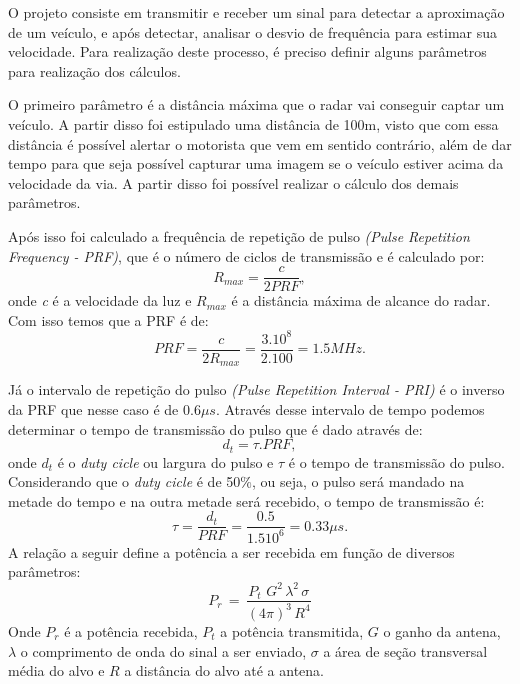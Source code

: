 O projeto consiste em transmitir e receber um sinal para detectar a aproximação de um veículo, e após detectar, analisar o desvio de frequência para estimar sua velocidade. Para realização deste processo, é preciso definir alguns parâmetros para realização dos cálculos.

O primeiro parâmetro é a distância máxima que o radar vai conseguir captar um veículo. A partir disso foi estipulado uma distância de 100m, visto que com essa distância é possível alertar o motorista que vem em sentido contrário, além de dar tempo para que seja possível capturar uma imagem se o veículo estiver acima da velocidade da via. A partir disso foi possível realizar o cálculo dos demais parâmetros.

Após isso foi calculado a frequência de repetição de pulso \emph{ (Pulse Repetition Frequency - PRF)},  que é o número de ciclos de transmissão e é calculado por:
\begin{equation}\label{R_MAX}
    R_{max} =  \frac{c}{2PRF},
\end{equation}
onde \emph{c} é a velocidade da luz e $R_{max}$ é a distância máxima de alcance do radar. Com isso temos que a PRF é de:
\begin{equation}\label{PRF}
  PRF =  \frac{c}{2R_{max}} = \frac{3.10^8}{2.100} = 1.5MHz.
\end{equation}

Já o intervalo de repetição do pulso \emph{(Pulse Repetition Interval - PRI)} é o inverso da PRF que nesse caso é de $0.6\mu s$. Através desse intervalo de tempo podemos determinar o tempo de transmissão do pulso que é dado através de: 
\begin{equation}\label{duty}
  d_t = \tau . PRF,
\end{equation}
onde $d_t$ é o \emph{duty cicle} ou largura do pulso e $\tau$ é o tempo de transmissão do pulso. Considerando que o \emph{duty cicle} é de 50$\%$, ou seja, o pulso será mandado na metade do tempo e na outra metade será recebido, o tempo de transmissão é:
\begin{equation}\label{tal}
  \tau = \frac{d_t}{PRF} =  \frac{0.5}{1.510^6} = 0.33\mu s.
\end{equation}
A relação a seguir define a potência a ser recebida em função de diversos parâmetros:
\begin{equation}\label{potencia_recebida}
    P_r\, =\,    \frac{P_{t}\,\, G^{2}\,   \lambda^{2}\, \sigma }{(4\pi)^{3}\,  R^{4}} 
\end{equation}%
Onde $P_r$ é a potência recebida, $P_t$ a potência transmitida, $G$ o ganho da antena, $\lambda$ o comprimento de onda do sinal a ser enviado, $\sigma$ a área de seção transversal média do alvo e $R$ a distância do alvo até a antena.

